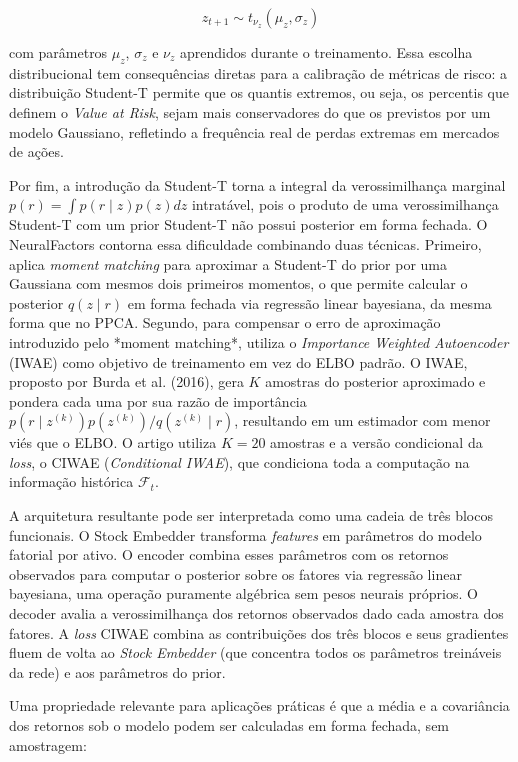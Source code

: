 $$z_{t+1} \sim t_{\nu_z}(\mu_z, \sigma_z)$$

com parâmetros $\mu_z$, $\sigma_z$ e $\nu_z$ aprendidos durante o treinamento. Essa escolha distribucional tem consequências diretas para a calibração de métricas de risco: a distribuição Student-T permite que os quantis extremos, ou seja, os percentis que definem o \textit{Value at Risk}, sejam mais conservadores do que os previstos por um modelo Gaussiano, refletindo a frequência real de perdas extremas em mercados de ações.

Por fim, a introdução da Student-T torna a integral da verossimilhança marginal $p(r) = \int p(r \mid z) p(z) dz$ intratável, pois o produto de uma verossimilhança Student-T com um prior Student-T não possui posterior em forma fechada. O NeuralFactors contorna essa dificuldade combinando duas técnicas. Primeiro, aplica \textit{moment matching} para aproximar a Student-T do prior por uma Gaussiana com mesmos dois primeiros momentos, o que permite calcular o posterior $q(z \mid r)$ em forma fechada via regressão linear bayesiana, da mesma forma que no PPCA. Segundo, para compensar o erro de aproximação introduzido pelo *moment matching*, utiliza o \textit{Importance Weighted Autoencoder} (IWAE) como objetivo de treinamento em vez do ELBO padrão. O IWAE, proposto por Burda et al. (2016), gera $K$ amostras do posterior aproximado e pondera cada uma por sua razão de importância $p(r \mid z^{(k)}) p(z^{(k)}) / q(z^{(k)} \mid r)$, resultando em um estimador com menor viés que o ELBO. O artigo utiliza $K=20$ amostras e a versão condicional da \textit{loss}, o CIWAE (\textit{Conditional IWAE}), que condiciona toda a computação na informação histórica $\mathcal{F}_t$.

A arquitetura resultante pode ser interpretada como uma cadeia de três blocos funcionais. O Stock Embedder transforma \textit{features} em parâmetros do modelo fatorial por ativo. O encoder combina esses parâmetros com os retornos observados para computar o posterior sobre os fatores via regressão linear bayesiana, uma operação puramente algébrica sem pesos neurais próprios. O decoder avalia a verossimilhança dos retornos observados dado cada amostra dos fatores. A \textit{loss} CIWAE combina as contribuições dos três blocos e seus gradientes fluem de volta ao \textit{Stock Embedder} (que concentra todos os parâmetros treináveis da rede) e aos parâmetros do prior.

Uma propriedade relevante para aplicações práticas é que a média e a covariância dos retornos sob o modelo podem ser calculadas em forma fechada, sem amostragem:

